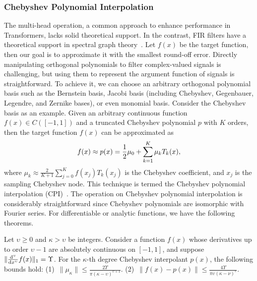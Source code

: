 \subsubsection{Chebyshev Polynomial Interpolation}
The multi-head operation, a common approach to enhance performance in Transformers, lacks solid theoretical support. In the contrast, FIR filters have a theoretical support in spectral graph theory~\citep{chung1997spectral}. Let $f(x)$ be the target function, then our goal is to approximate it with the smallest round-off error. Directly manipulating orthogonal polynomials to filter complex-valued signals is challenging, but using them to represent the argument function of signals is straightforward. To achieve it, we can choose an arbitrary orthogonal polynomial basis such as the Bernstein basis, Jacobi basis (including Chebyshev, Gegenbauer, Legendre, and Zernike bases), or even monomial basis. Consider the Chebyshev basis as an example. Given an arbitrary continuous function $f(x) \in C([-1,1])$ and a truncated Chebyshev polynomial $p$ with $K$ orders, then the target function $f(x)$ can be approximated as
\begin{equation}\label{eq:cpi}
\centering
f(x) \approx p(x) = \frac{1}{2}{\mu}_{0} + \sum_{k=1}^{K}{\mu}_{k}{T}_{k}(x),
\end{equation}
where $\mu_{k} \approx \frac{2}{K+1}\sum_{j=0}^{K}f(x_{j})T_{k}(x_{j})$ is the Chebyshev coefficient, and $x_{j}$ is the sampling Chebyshev node. This technique is termed the Chebyshev polynomial interpolation (CPI)~\citep{10.1137/1.9781611975949}. The operation on Chebyshev polynomial interpolation is considerably straightforward since Chebyshev polynomials are isomorphic with Fourier series. For differentiable or analytic functions, we have the following theorems.

\begin{theorem}\label{theorem:cpi_diff}
Let $\upsilon \geq 0$ and $\kappa > \upsilon$ be integers. Consider a function $f(x)$ whose derivatives up to order $\upsilon-1$ are absolutely continuous on $[-1, 1]$, and suppose $\lVert{\frac{\mathop{}\!\mathrm{d}^{\upsilon}}{\mathop{}\!\mathrm{d}{x}^{\upsilon}} f(x)}\rVert_{1} = \Upsilon$. For the $\kappa$-th degree Chebyshev interpolant $p(x)$, the following bounds hold: (1)~$\lVert{\mu_{\kappa}}\rVert \leq \frac{2\Upsilon}{\pi(\kappa-\upsilon)^{\upsilon+1}}$. (2)~$\lVert{f(x) - p(x)}\rVert \leq \frac{4\Upsilon}{\pi\upsilon(\kappa-\nu)^{\upsilon}}$.
\end{theorem}

